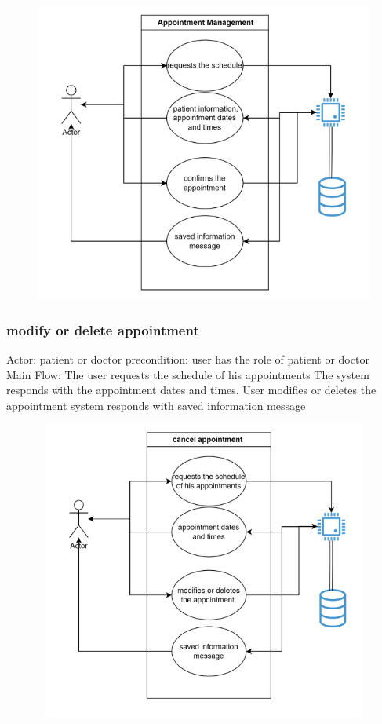\documentclass{scrreprt}
\begin{document}
	\begin{figure}[h]
		\begin{center}
			\includegraphics[width=350pt,height=280pt]{usuario4.png}
		\end{center}
		\label{fig:Use case 4}
	\end{figure}
	\pagebreak
	\subsubsection{ modify or delete appointment}
	Actor: patient or doctor
	precondition: user has the role of patient or doctor\\
	Main Flow:
	The user requests the schedule of his appointments 
	The system responds with the appointment dates and times.
	User modifies or deletes the appointment 
	system responds with saved information message
	\begin{figure}[h]
		\begin{center}
			\includegraphics[width=350pt,height=280pt]{usuario5.png}
		\end{center}
		\label{fig:Use case 5}
	\end{figure}
	\pagebreak
\end{document}
